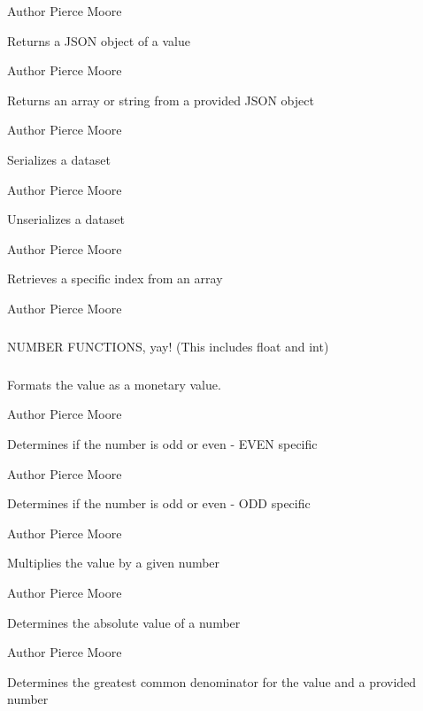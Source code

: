 \begin{DoxyAuthor}{Author}
Pierce Moore
\end{DoxyAuthor}
Returns a J\-S\-O\-N object of a value

\begin{DoxyAuthor}{Author}
Pierce Moore
\end{DoxyAuthor}
Returns an array or string from a provided J\-S\-O\-N object

\begin{DoxyAuthor}{Author}
Pierce Moore
\end{DoxyAuthor}
Serializes a dataset

\begin{DoxyAuthor}{Author}
Pierce Moore
\end{DoxyAuthor}
Unserializes a dataset

\begin{DoxyAuthor}{Author}
Pierce Moore
\end{DoxyAuthor}
Retrieves a specific index from an array

\begin{DoxyAuthor}{Author}
Pierce Moore
\end{DoxyAuthor}
\subparagraph*{}

\begin{DoxyVerb}                   NUMBER FUNCTIONS, yay! (This includes float and int)\end{DoxyVerb}
 \subparagraph*{}

Formats the value as a monetary value.

\begin{DoxyAuthor}{Author}
Pierce Moore
\end{DoxyAuthor}
Determines if the number is odd or even -\/ E\-V\-E\-N specific

\begin{DoxyAuthor}{Author}
Pierce Moore
\end{DoxyAuthor}
Determines if the number is odd or even -\/ O\-D\-D specific

\begin{DoxyAuthor}{Author}
Pierce Moore
\end{DoxyAuthor}
Multiplies the value by a given number

\begin{DoxyAuthor}{Author}
Pierce Moore
\end{DoxyAuthor}
Determines the absolute value of a number

\begin{DoxyAuthor}{Author}
Pierce Moore
\end{DoxyAuthor}
Determines the greatest common denominator for the value and a provided number

